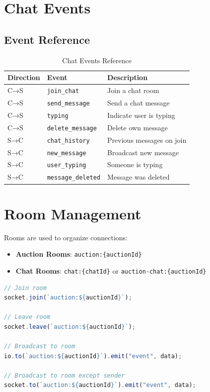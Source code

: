 \documentclass[12pt,a4paper]{report}
\begin{document}
\section{Chat Events}

\subsection{Event Reference}

\begin{table}[H]
\centering
\begin{tabularx}{\textwidth}{|l|l|X|}
\hline
\textbf{Direction} & \textbf{Event} & \textbf{Description} \\
\hline
C→S & \texttt{join\_chat} & Join a chat room \\
\hline
C→S & \texttt{send\_message} & Send a chat message \\
\hline
C→S & \texttt{typing} & Indicate user is typing \\
\hline
C→S & \texttt{delete\_message} & Delete own message \\
\hline
S→C & \texttt{chat\_history} & Previous messages on join \\
\hline
S→C & \texttt{new\_message} & Broadcast new message \\
\hline
S→C & \texttt{user\_typing} & Someone is typing \\
\hline
S→C & \texttt{message\_deleted} & Message was deleted \\
\hline
\end{tabularx}
\caption{Chat Events Reference}
\end{table}

\section{Room Management}

Rooms are used to organize connections:

\begin{itemize}
    \item \textbf{Auction Rooms}: \texttt{auction:\{auctionId\}}
    \item \textbf{Chat Rooms}: \texttt{chat:\{chatId\}} or \texttt{auction-chat:\{auctionId\}}
\end{itemize}

\begin{lstlisting}[language=JavaScript, caption=Room Management]
// Join room
socket.join(`auction:${auctionId}`);

// Leave room
socket.leave(`auction:${auctionId}`);

// Broadcast to room
io.to(`auction:${auctionId}`).emit("event", data);

// Broadcast to room except sender
socket.to(`auction:${auctionId}`).emit("event", data);
\end{lstlisting}
\end{document}
